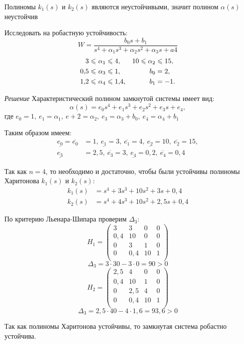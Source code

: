 \documentclass[../../TAU.tex]{subfiles}
\begin{document}
    Полиномы ${k}_1(s)$ и ${k}_2(s)$ являются неустойчивыми, значит полином $\alpha(s)$ неустойчив

    \examp Исследовать на робастную устойчивость:
    $$
    W=\frac{b_0s+b_1}{s^4+\alpha_1s^3+\alpha_2s^2+\alpha_3s+a4}
    $$
    \begin{align*}
        3\leqslant\ &\alpha_1\leqslant4, & 10\leqslant \alpha_2&\leqslant15, \\
        0{,}5\leqslant\ &\alpha_3\leqslant1, & b_0&=2, \\
        1{,}2\leqslant\ &\alpha_4\leqslant1{,}4, & b_1&=-1.
    \end{align*}

    {\it Решение}
    Характеристический полином замкнутой системы имеет вид:
    $$
        \alpha(s)=e_0s^4+e_1s^3+e_2s^2+e_3s+e_4,
    $$    
    где 
    $e_0=1,\ e_1=\alpha_1,\ e+2 =\alpha_2,\ e_3=\alpha_3+b_0,\ e_4=\alpha_4+b_1$

    Таким образом имеем:
    \begin{align*}
        \underline{e_0}=\overline{e_0}&=1,\ 
        \underline{e_1}=3,\ \overline{e_1}=4,\
        \underline{e_2}=10,\ \overline{e_2}=15,\\
        \underline{e_3}&=2{,}5,\ \overline{e_3}=3,\ 
        \underline{e_4}=0{,}2,\ \overline{e_4}=0{,}4
    \end{align*}

    Так как $n=4$, то необходимо и достаточно, чтобы были устойчивы полиномы  Харитонова 
    ${k}_1(s)$ и ${k}_2(s)$:
    \begin{align*}
        k_1(s)&=s^4+3s^3+10s^2+3s+0{,}4\\
        k_2(s)&=s^4+4s^3+10s^2+2{,}5s+0{,}4
    \end{align*}

    По критерию Льенара-Шипара проверим $\Delta_3$:
    $$
        H_1=
        \begin{pmatrix}
            3 & 3 & 0 & 0 \\
            0{,}4 & 10 & 0 & 0 \\
            0 & 3 & 1 & 0 \\
            0 & 0{,}4 & 10 & 1 \\
        \end{pmatrix}
    $$
    $$
        \Delta_3=3\cdot30-3\cdot0=90>0
    $$
    $$
        H_2=
        \begin{pmatrix}
            2{,}5 & 4 & 0 & 0 \\
            0{,}4 & 10 & 1 & 0 \\
            0 & 2{,}5 & 4 & 0 \\
            0 & 0{,}4 & 10 & 1 \\
        \end{pmatrix}
    $$
    $$
        \Delta_3=2{,}5\cdot40-4\cdot1{,}6=93{,}6>0
    $$

    Так как полиномы Харитонова устойчивы, то замкнутая система робастно устойчива.
\end{document}
